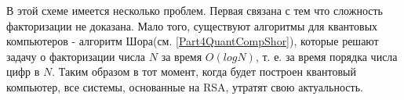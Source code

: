 В этой схеме имеется несколько проблем. Первая связана с тем что
сложность факторизации не доказана. Мало того, существуют алгоритмы для
квантовых компьютеров - алгоритм Шора(см. \ref {Part4QuantCompShor}),
которые решают задачу о факторизации числа $N$ за время $O\left(log
N\right)$, т. е. за время порядка числа цифр в $N$. Таким образом в
тот момент, когда будет построен квантовый компьютер, все системы,
основанные на RSA, утратят свою актуальность. 

